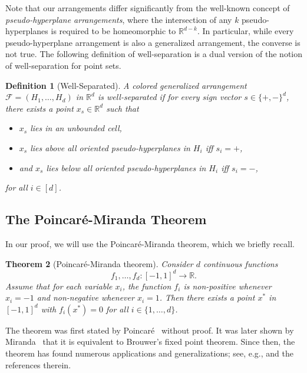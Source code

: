 \documentclass[11pt]{article}
\newtheorem{theorem}{Theorem}
\newtheorem{definition}[theorem]{Definition}
\newcommand{\R}{\mathbb{R}}
\begin{document}
%
Note that our arrangements differ significantly from the well-known concept of \emph{pseudo-hyperplane arrangements}, where the intersection of any $k$ pseudo-hyperplanes is required to be homeomorphic to $\R^{d - k}$. In particular, while every pseudo-hyperplane arrangement is also a generalized arrangement, the converse is not true. 
%
The following definition of well-separation is a dual version of the notion of well-separation for point sets.
%
\begin{definition}[Well-Separated]
A colored generalized arrangement $\mathcal{F}=(H_1, \dots, H_d)$ in $\mathbb{R}^d$ is \emph{well-separated} if for every sign vector $s \in \{+, -\}^d$, there exists a point $x_s \in \mathbb{R}^d$ such that 
\begin{itemize}
    \item $x_s$ lies in an unbounded cell,
    \item $x_s$ lies above all oriented pseudo-hyperplanes in $H_i$ iff $s_i = +$,
    \item and $x_s$ lies below all oriented pseudo-hyperplanes in $H_i$ iff $s_i = -$,
\end{itemize}
for all $i \in [d]$.
\end{definition}
%
%
%
\subsection{The Poincar\'{e}-Miranda Theorem}
\label{sec:poincare-miranda}
%
In our proof, we will use the Poincar\'{e}-Miranda theorem, which we briefly recall.
%
\begin{theorem}[Poincar\'{e}-Miranda theorem]
Consider $d$ continuous functions
\[f_1,\ldots,f_d: [-1,1]^d\rightarrow \mathbb{R}.\]
Assume that for each variable $x_i$, the function $f_i$ is non-positive whenever $x_i=-1$ and non-negative whenever $x_i=1$.
Then there exists a point $x^*$ in $[-1,1]^d$ with $f_i(x^*)=0$ for all $i\in\{1,\ldots,d\}$.
\end{theorem}
%
The theorem was first stated by Poincar\'{e}~\cite{poincare1883} without proof. It was later shown by Miranda~\cite{miranda1940} that it is equivalent to Brouwer’s fixed point theorem.
Since then, the theorem has found numerous applications and generalizations; see, e.g., \cite{ariza2019poincare} and the references therein.
%
\end{document}
